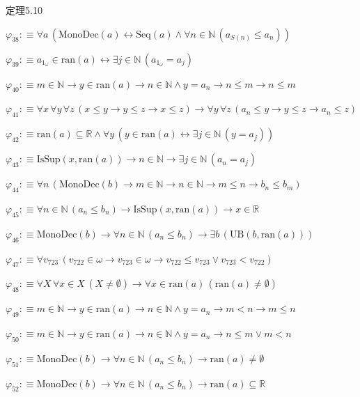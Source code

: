 \begin{fullproof}{定理5.10}
\begin{abbrevlist}
\item $\varphi_{38} :\equiv \forall a\,(\mathrm{MonoDec}(a) \leftrightarrow \mathrm{Seq}(a) \land \forall n \in \mathbb{N}\,(a_{S(n)} \leq a_{n}))$
\item $\varphi_{39} :\equiv a_{1_{\omega}} \in \mathrm{ran}(a) \leftrightarrow \exists j \in \mathbb{N}\,(a_{1_{\omega}} = a_{j})$
\item $\varphi_{40} :\equiv m \in \mathbb{N} \to y \in \mathrm{ran}(a) \to n \in \mathbb{N} \land y = a_{n} \to n \leq m \to n \leq m$
\item $\varphi_{41} :\equiv \forall x\,\forall y\,\forall z\,(x \leq y \to y \leq z \to x \leq z) \to \forall y\,\forall z\,(a_{n} \leq y \to y \leq z \to a_{n} \leq z)$
\item $\varphi_{42} :\equiv \mathrm{ran}(a) \subseteq \mathbb{R} \land \forall y\,(y \in \mathrm{ran}(a) \leftrightarrow \exists j \in \mathbb{N}\,(y = a_{j}))$
\item $\varphi_{43} :\equiv \mathrm{IsSup}(x,\mathrm{ran}(a)) \to n \in \mathbb{N} \to \exists j \in \mathbb{N}\,(a_{n} = a_{j})$
\item $\varphi_{44} :\equiv \forall n\,(\mathrm{MonoDec}(b) \to m \in \mathbb{N} \to n \in \mathbb{N} \to m \leq n \to b_{n} \leq b_{m})$
\item $\varphi_{45} :\equiv \forall n \in \mathbb{N}\,(a_{n} \leq b_{n}) \to \mathrm{IsSup}(x,\mathrm{ran}(a)) \to x \in \mathbb{R}$
\item $\varphi_{46} :\equiv \mathrm{MonoDec}(b) \to \forall n \in \mathbb{N}\,(a_{n} \leq b_{n}) \to \exists b\,(\mathrm{UB}(b,\mathrm{ran}(a)))$
\item $\varphi_{47} :\equiv \forall v_{723}\,(v_{722} \in \omega \to v_{723} \in \omega \to v_{722} \leq v_{723} \lor v_{723} < v_{722})$
\item $\varphi_{48} :\equiv \forall X\,\forall x \in X\,(X \neq \emptyset) \to \forall x \in \mathrm{ran}(a)\,(\mathrm{ran}(a) \neq \emptyset)$
\item $\varphi_{49} :\equiv m \in \mathbb{N} \to y \in \mathrm{ran}(a) \to n \in \mathbb{N} \land y = a_{n} \to m < n \to m \leq n$
\item $\varphi_{50} :\equiv m \in \mathbb{N} \to y \in \mathrm{ran}(a) \to n \in \mathbb{N} \land y = a_{n} \to n \leq m \lor m < n$
\item $\varphi_{51} :\equiv \mathrm{MonoDec}(b) \to \forall n \in \mathbb{N}\,(a_{n} \leq b_{n}) \to \mathrm{ran}(a) \neq \emptyset$
\item $\varphi_{52} :\equiv \mathrm{MonoDec}(b) \to \forall n \in \mathbb{N}\,(a_{n} \leq b_{n}) \to \mathrm{ran}(a) \subseteq \mathbb{R}$

\end{abbrevlist}
\end{fullproof}

